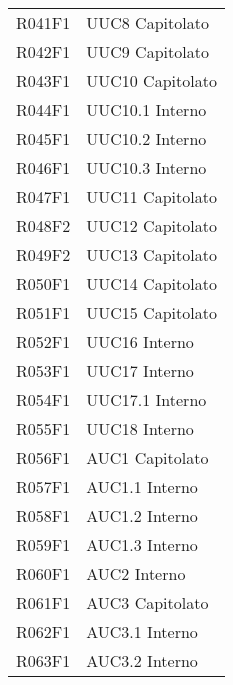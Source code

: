 \documentclass[../analisi-dei-requisiti.tex]{subfiles}
\begin{document}
\begin{longtable}[H]{ p{4cm} | p{4cm} }
  R041F1                               & UUC8 Capitolato               \\
  R042F1                               & UUC9 Capitolato               \\
  R043F1                               & UUC10 Capitolato              \\
  R044F1                               & UUC10.1 Interno               \\
  R045F1                               & UUC10.2 Interno               \\
  R046F1                               & UUC10.3 Interno               \\
  R047F1                               & UUC11 Capitolato              \\
  R048F2                               & UUC12 Capitolato              \\
  R049F2                               & UUC13 Capitolato              \\
  R050F1                               & UUC14 Capitolato              \\
  R051F1                               & UUC15 Capitolato              \\
  R052F1                               & UUC16 Interno                 \\
  R053F1                               & UUC17 Interno                 \\
  R054F1                               & UUC17.1 Interno               \\
  R055F1                               & UUC18 Interno                 \\
  R056F1                               & AUC1 Capitolato               \\
  R057F1                               & AUC1.1 Interno                \\
  R058F1                               & AUC1.2 Interno                \\
  R059F1                               & AUC1.3 Interno                \\
  R060F1                               & AUC2 Interno                  \\
  R061F1                               & AUC3 Capitolato               \\
  R062F1                               & AUC3.1 Interno                \\
  R063F1                               & AUC3.2 Interno                \\

\end{longtable}
\end{document}
